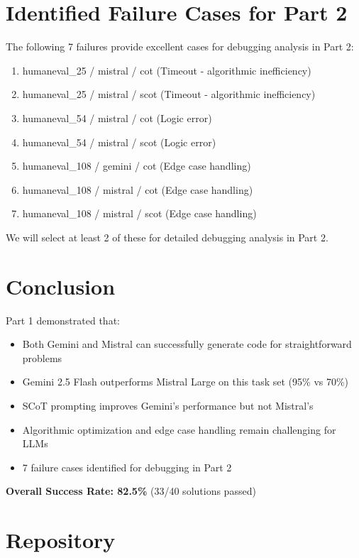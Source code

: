 \documentclass[11pt]{article}
\begin{document}
\section{Identified Failure Cases for Part 2}

The following 7 failures provide excellent cases for debugging analysis in Part 2:

\begin{enumerate}
    \item humaneval\_25 / mistral / cot (Timeout - algorithmic inefficiency)
    \item humaneval\_25 / mistral / scot (Timeout - algorithmic inefficiency)
    \item humaneval\_54 / mistral / cot (Logic error)
    \item humaneval\_54 / mistral / scot (Logic error)
    \item humaneval\_108 / gemini / cot (Edge case handling)
    \item humaneval\_108 / mistral / cot (Edge case handling)
    \item humaneval\_108 / mistral / scot (Edge case handling)
\end{enumerate}

We will select at least 2 of these for detailed debugging analysis in Part 2.

\section{Conclusion}

Part 1 demonstrated that:
\begin{itemize}
    \item Both Gemini and Mistral can successfully generate code for straightforward problems
    \item Gemini 2.5 Flash outperforms Mistral Large on this task set (95\% vs 70\%)
    \item SCoT prompting improves Gemini's performance but not Mistral's
    \item Algorithmic optimization and edge case handling remain challenging for LLMs
    \item 7 failure cases identified for debugging in Part 2
\end{itemize}

\textbf{Overall Success Rate: 82.5\%} (33/40 solutions passed)

\section{Repository}
\end{document}
